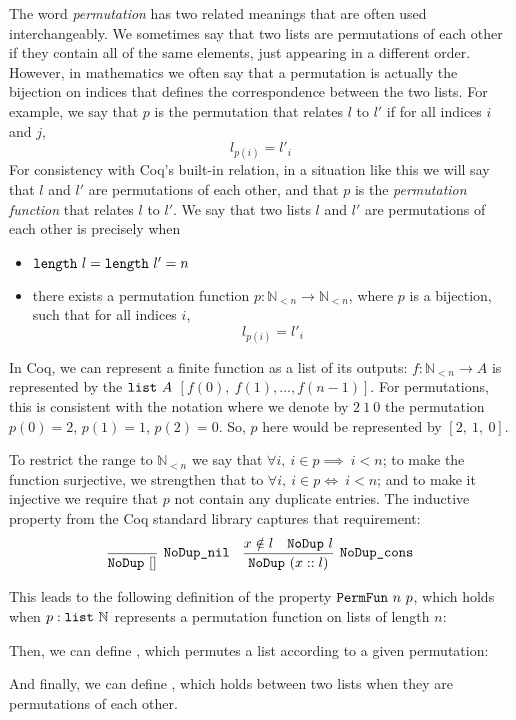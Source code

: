 \documentclass[sigplan,10pt,anonymous,review]{thesis}
\begin{document}
The word \textit{permutation} has two related meanings that are often
used interchangeably. We sometimes say that two lists are permutations of each
other if they contain all of the same elements, just appearing in a
different order. However, in mathematics we often say that a
permutation is actually the bijection on indices that defines the
correspondence between the two lists. For example, we say that $p$ is
the permutation that relates $l$ to $l'$ if for all indices $i$ and
$j$,
\begin{equation*}
  l_{p(i)} = l'_i
\end{equation*}
For consistency with Coq's built-in  relation, in a
situation like this we will say that $l$ and $l'$ are permutations of
each other, and that $p$ is the \textit{permutation function} that
relates $l$ to $l'$. We say that two lists $l$ and $l'$ are
permutations of each other is precisely when
\begin{itemize}
  \item $\texttt{length}~l = \texttt{length}~l' = n$
  \item there exists a permutation function $p : \mathbb{N}_{<n} \to
    \mathbb{N}_{<n}$, where $p$ is a bijection, such that for all indices $i$,
    \begin{equation*}
      l_{p(i)} = l'_i
    \end{equation*}
\end{itemize}

In Coq, we can represent a finite function as a list of its outputs:
$f : \mathbb{N}_{<n} \to A$ is represented by the $\texttt{list}~A$
$[f(0),~f(1),\ldots,f(n-1)]$. For permutations, this is consistent with the
notation where we denote by $2~1~0$ the permutation $p(0) = 2$, $p(1)
= 1$, $p(2) = 0$. So, $p$ here would be represented by $[2,~1,~0]$.

To restrict the range to $\mathbb{N}_{<n}$ we say that $\forall i,~i \in p
\implies ~i<n$; to make the function surjective, we strengthen that to
$\forall i,~i \in p \iff ~i<n$; and to make it injective we require that $p$ not
contain any duplicate entries. The inductive property  from
the Coq standard library captures that requirement:
\begin{align*}
  \infer[\var{NoDup\_nil}]{\var{NoDup}~[]}{}
  &&
  \infer[\var{NoDup\_cons}]{\var{NoDup}~(x :: l)}{%
    x \notin l & \var{NoDup}~l
  }
\end{align*}

This leads to the following definition of the property
$\texttt{PermFun}~n~p$, which holds when $p : \texttt{list}~\mathbb{N}$
represents a permutation function on lists of length $n$:

Then, we can define , which permutes a list according to a
given permutation:

And finally, we can define , which holds between
two lists when they are permutations of each other.

\end{document}
